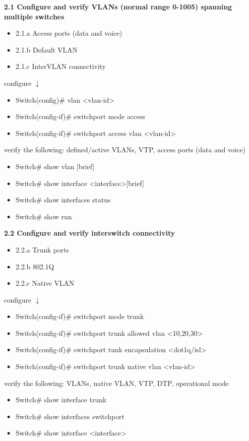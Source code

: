 \documentclass{article}
\begin{document}
\noindent\textbf{2.1 Configure and verify VLANs (normal range 0-1005) spanning multiple switches}
\begin{itemize}
\item 2.1.a Access ports (data and voice)
\item 2.1.b Default VLAN
\item 2.1.c InterVLAN connectivity
\end{itemize}

configure $\downarrow$
\begin{itemize}
\item Switch(config)\# vlan \textless vlan-id\textgreater
\item Switch(config-if)\# switchport mode access
\item Switch(config-if)\# switchport access vlan \textless vlan-id\textgreater
\end{itemize}

verify the following: defined/active VLANs, VTP, access ports (data and voice)
\begin{itemize}
\item Switch\# show vlan [brief]
\item Switch\# show interface \textless interface\textgreater [brief]
\item Switch\# show interfaces status
\item Switch\# show run
\end{itemize}
  	
\noindent\textbf{2.2 Configure and verify interswitch connectivity}
\begin{itemize}
\item 2.2.a Trunk ports
\item 2.2.b 802.1Q
\item 2.2.c Native VLAN
\end{itemize}

configure $\downarrow$
\begin{itemize}
\item Switch(config-if)\# switchport mode trunk
\item Switch(config-if)\# switchport trunk allowed vlan \textless 10,20,30\textgreater
\item Switch(config-if)\# switchport tunk encapsulation \textless dot1q/isl\textgreater
\item Switch(config-if)\# switchport trunk native vlan \textless vlan-id\textgreater
\end{itemize}

verify the following: VLANs, native VLAN, VTP, DTP, operational mode
\begin{itemize}
\item Switch\# show interface trunk
\item Switch\# show interfaces switchport
\item Switch\# show interface \textless interface\textgreater
\end{itemize}
  		
\end{document}
